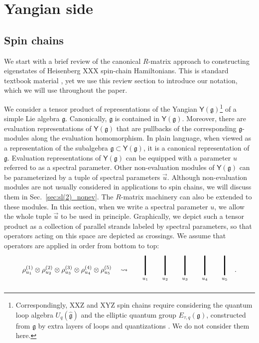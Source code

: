 \documentclass[10pt]{article}
\theoremstyle{definition}
\def\fg{\mathfrak{g}}
\def\myY{{\mathsf{Y}}}
\numberwithin{equation}{section}
\begin{document}
\section{Yangian side}\label{sec:Yangian}

\subsection{Spin chains}\label{sec:spin_chains}

 We start with a brief review of the canonical $R$-matrix approach to constructing eigenstates of Heisenberg XXX spin-chain Hamiltonians.
 This is standard textbook material \cite{Sklyanin:1979pfu,TakhtajanFaddeev1979,slavnov2019algebraicbetheansatz}, yet we use this review section to introduce our notation, which we will use throughout the paper.
 
 We consider a tensor product of representations of the Yangian $\myY(\fg)$\footnote{
 	Correspondingly, XXZ and XYZ spin chains require considering the quantum loop algebra $U_q(\hat{\fg})$ and the elliptic quantum group $E_{\tau,q}(\fg)$, constructed from $\fg$ by extra layers of loops and quantizations \cite{Konno2020,Jimbo1999}.
 	We do not consider them here.
 } of a simple Lie algebra $\fg$.
 Canonically, $\fg$ is contained in $\myY(\fg)$.
 Moreover, there are evaluation representations of $\myY(\fg)$ that are pullbacks of the corresponding $\fg$-modules along the evaluation homomorphism.
 In plain language, when viewed as a representation of the subalgebra $\fg\subset\myY(\fg)$, it is a canonical representation of $\fg$.
 Evaluation representations of $\myY(\fg)$ can be equipped with a parameter $u$ referred to as a spectral parameter.
 Other non-evaluation modules of $\myY(\fg)$ can be parameterized by a tuple of spectral parameters $\vec u$.
 Although non-evaluation modules are not usually considered in applications to spin chains, we will discuss them in Sec.~\ref{sec:sl(2)_nonev}.
 The $R$-matrix machinery can also be extended to these modules.
 In this section, when we write a spectral parameter $u$, we allow the whole tuple $\vec u$ to be used in principle. 
 Graphically, we depict such a tensor product as a collection of parallel strands labeled by spectral parameters, so that operators acting on this space are depicted as crossings.
 We assume that operators are applied in order from bottom to top:
 \begin{equation}
 	\rho^{(1)}_{u_1}\otimes \rho^{(2)}_{u_2}\otimes \rho^{(3)}_{u_3}\otimes \rho^{(4)}_{u_4}\otimes \rho^{(5)}_{u_5} \quad\rightsquigarrow\quad \begin{array}{c}
 		\begin{tikzpicture}
 			\foreach \i/\t in {0/1, 1/2, 2/3, 3/4, 4/5}
 			{
 				\draw[ultra thick] (\i,0) -- (\i,1);
 				\node[below] at (\i,0) {$\scriptstyle u_{\t}$};
 			}
 		\end{tikzpicture}
 	\end{array}\,.
 \end{equation}
 
\end{document}
